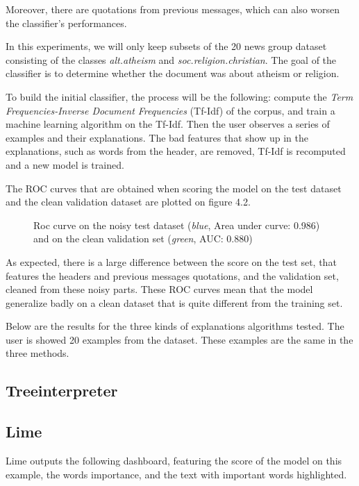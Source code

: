 \documentclass[a4paper,11pt]{kth-mag}
\begin{document}
Moreover, there are quotations from previous messages, which can also worsen the classifier's performances.

In this experiments, we will only keep subsets of the 20 news group dataset consisting of the classes \textit{alt.atheism} and \textit{soc.religion.christian}. The goal of the classifier is to determine whether the document was about atheism or religion.

To build the initial classifier, the process will be the following: compute the \textit{Term Frequencies-Inverse Document Frequencies} (Tf-Idf) of the corpus, and train a machine learning algorithm on the Tf-Idf. Then the user observes a series of examples and their explanations. The bad features that show up in the explanations, such as words from the header, are removed, Tf-Idf is recomputed and a new model is trained.

The ROC curves that are obtained when scoring the model on the test dataset and the clean validation dataset are plotted on figure 4.2.

\begin{figure}[h]
		\centering
    	\def\svgwidth{\columnwidth}
    	\resizebox{0.75\textwidth}{!}{}
    	\caption{Roc curve on the noisy test dataset (\textit{blue}, Area under curve: 0.986) and on the clean validation set (\textit{green}, AUC: 0.880)}
\end{figure}

As expected, there is a large difference between the score on the test set, that features the headers and previous messages quotations, and the validation set, cleaned from these noisy parts. These ROC curves mean that the model generalize badly on a clean dataset that is quite different from the training set.

Below are the results for the three kinds of explanations algorithms tested. The user is showed 20 examples from the dataset. These examples are the same in the three methods.

\subsection{Treeinterpreter}

\subsection{Lime}

Lime outputs the following dashboard, featuring the score of the model on this example, the words importance, and the text with important words highlighted.
\end{document}
